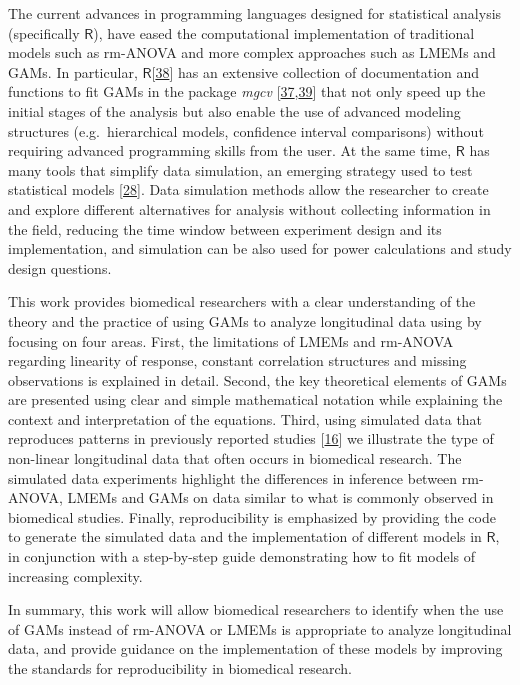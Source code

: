 \documentclass[
]{article}
\begin{document}
The current advances in programming languages designed for statistical analysis (specifically \(\textsf{R}\)), have eased the computational implementation of traditional models such as rm-ANOVA and more complex approaches such as LMEMs and GAMs. In particular, \(\textsf{R}\){[}\protect\hyperlink{ref-r}{38}{]} has an extensive collection of documentation and functions to fit GAMs in the package \emph{mgcv} {[}\protect\hyperlink{ref-wood2017}{37},\protect\hyperlink{ref-wood2016}{39}{]} that not only speed up the initial stages of the analysis but also enable the use of advanced modeling structures (e.g.~hierarchical models, confidence interval comparisons) without requiring advanced programming skills from the user. At the same time, \(\textsf{R}\) has many tools that simplify data simulation, an emerging strategy used to test statistical models {[}\protect\hyperlink{ref-haverkamp2017}{28}{]}. Data simulation methods allow the researcher to create and explore different alternatives for analysis without collecting information in the field, reducing the time window between experiment design and its implementation, and simulation can be also used for power calculations and study design questions.

This work provides biomedical researchers with a clear understanding of the theory and the practice of using GAMs to analyze longitudinal data using by focusing on four areas. First, the limitations of LMEMs and rm-ANOVA regarding linearity of response, constant correlation structures and missing observations is explained in detail. Second, the key theoretical elements of GAMs are presented using clear and simple mathematical notation while explaining the context and interpretation of the equations. Third, using simulated data that reproduces patterns in previously reported studies {[}\protect\hyperlink{ref-vishwanath2009}{16}{]} we illustrate the type of non-linear longitudinal data that often occurs in biomedical research. The simulated data experiments highlight the differences in inference between rm-ANOVA, LMEMs and GAMs on data similar to what is commonly observed in biomedical studies. Finally, reproducibility is emphasized by providing the code to generate the simulated data and the implementation of different models in \(\textsf{R}\), in conjunction with a step-by-step guide demonstrating how to fit models of increasing complexity.

In summary, this work will allow biomedical researchers to identify when the use of GAMs instead of rm-ANOVA or LMEMs is appropriate to analyze longitudinal data, and provide guidance on the implementation of these models by improving the standards for reproducibility in biomedical research.
\end{document}
